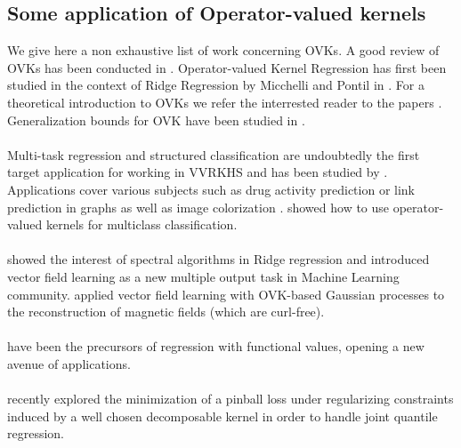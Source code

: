 \subsection{Some application of Operator-valued kernels}
We give here a non exhaustive list of work concerning \aclp{OVK}.  A good
review of \aclp{OVK} has been conducted in \citet{Alvarez2012}.
Operator-valued Kernel Regression has first been studied in the context of
Ridge Regression by Micchelli and Pontil in \cite{Micchelli2005}. For a
theoretical introduction to \acsp{OVK} we refer the interrested reader to the
papers \citet{carmeli2006vector, caponnetto2008, Carmeli2010}. Generalization
bounds for \acs{OVK} have been studied in \citet{Sindhwani2013,
kadri2015operator, rudi2016generalization}.
\paragraph{}
Multi-task regression and structured classification are undoubtedly the first
target application for working in \acl{VVRKHS} and has been studied by
\citet{Evgeniou2005, minh2013unifying}. Applications cover various subjects
such as drug activity prediction \citet{Brouard2016_jmlr} or link prediction in
graphs \citep{Brouard2011, Kadri_icml2013} as well as image colorization
\citep{ha2010image}.  showed how to use
operator-valued kernels for multiclass classification.
\paragraph{}
\citet{Macedo2008, Baldassare2012} showed the interest of spectral algorithms
in Ridge regression and introduced vector field learning as a new multiple
output task in Machine Learning community. \citet{Wahlstrom2013} applied vector
field learning with \acs{OVK}-based Gaussian processes to the reconstruction of
magnetic fields (which are curl-free).
\paragraph{}
\citet{kadri2015operator} have been the precursors of  regression with
functional values, opening a new avenue of applications.
\paragraph{}
\citet{sangnier2016joint} recently explored the minimization of
a pinball loss under regularizing constraints induced by a well chosen
decomposable kernel in order to handle joint quantile regression.
